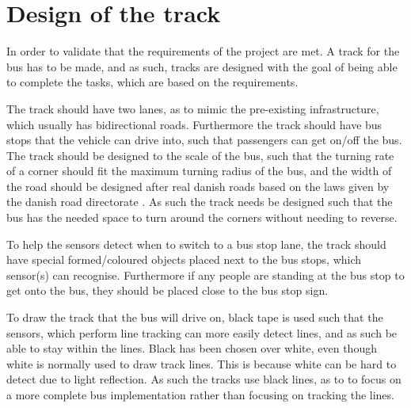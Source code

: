 \section{Design of the track} 

In order to validate that the requirements of the project are met. A track for the bus has to be made, and as such, tracks are designed with the goal of being able to complete the tasks, which are based on the requirements.

The track should have two lanes, as to mimic the pre-existing infrastructure, which usually has bidirectional roads. Furthermore the track should have bus stops that the vehicle can drive into, such that passengers can get on/off the bus.
The track should be designed to the scale of the bus, such that the turning rate of a corner should fit the maximum turning radius of the bus, and the width of the road should be designed after real danish roads based on the laws given by the danish road directorate \cite{roadRules}\cite{DriveingCurves}. As such the track needs be designed such that the bus has the needed space to turn around the corners without needing to reverse.

To help the sensors detect when to switch to a bus stop lane, the track should have special formed/coloured objects placed next to the bus stops, which sensor(s) can recognise. Furthermore if any people are standing at the bus stop to get onto the bus, they should be placed close to the bus stop sign.

To draw the track that the bus will drive on, black tape is used such that the sensors, which perform line tracking can more easily detect lines, and as such be able to stay within the lines. Black has been chosen over white, even though white is normally used to draw track lines. This is because white can be hard to detect due to light reflection. As such the tracks use black lines, as to to focus on a more complete bus implementation rather than focusing on tracking the lines.


